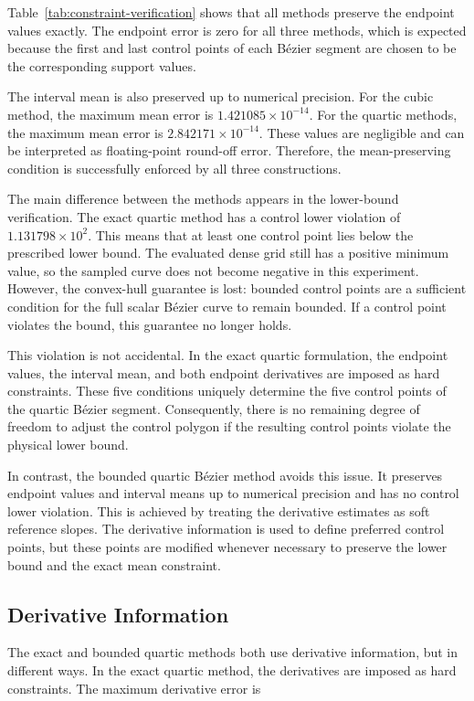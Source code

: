 \documentclass[12pt,a4paper]{article}
\begin{document}
Table~\ref{tab:constraint-verification} shows that all methods preserve the
endpoint values exactly. The endpoint error is zero for all three methods,
which is expected because the first and last control points of each B\'ezier
segment are chosen to be the corresponding support values.

The interval mean is also preserved up to numerical precision. For the cubic
method, the maximum mean error is \(1.421085\times 10^{-14}\). For the
quartic methods, the maximum mean error is \(2.842171\times 10^{-14}\).
These values are negligible and can be interpreted as floating-point
round-off error. Therefore, the mean-preserving condition is successfully
enforced by all three constructions.

The main difference between the methods appears in the lower-bound
verification. The exact quartic method has a control lower violation of
\(1.131798\times 10^2\). This means that at least one control point lies below
the prescribed lower bound. The evaluated dense grid still has a positive
minimum value, so the sampled curve does not become negative in this
experiment. However, the convex-hull guarantee is lost: bounded control
points are a sufficient condition for the full scalar B\'ezier curve to remain
bounded. If a control point violates the bound, this guarantee no longer
holds.

This violation is not accidental. In the exact quartic formulation, the
endpoint values, the interval mean, and both endpoint derivatives are imposed
as hard constraints. These five conditions uniquely determine the five
control points of the quartic B\'ezier segment. Consequently, there is no
remaining degree of freedom to adjust the control polygon if the resulting
control points violate the physical lower bound.

In contrast, the bounded quartic B\'ezier method avoids this issue. It
preserves endpoint values and interval means up to numerical precision and
has no control lower violation. This is achieved by treating the derivative
estimates as soft reference slopes. The derivative information is used to
define preferred control points, but these points are modified whenever
necessary to preserve the lower bound and the exact mean constraint.

\subsection{Derivative Information}

The exact and bounded quartic methods both use derivative information, but in
different ways. In the exact quartic method, the derivatives are imposed as
hard constraints. The maximum derivative error is
\end{document}
